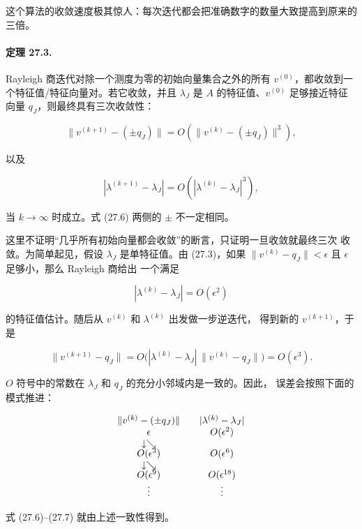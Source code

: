 \documentclass[UTF8,fontset=none,12pt]{ctexart}
\begin{document}
这个算法的收敛速度极其惊人：每次迭代都会把准确数字的数量大致提高到原来的
三倍。

\paragraph{定理 27.3.}
Rayleigh 商迭代对除一个测度为零的初始向量集合之外的所有
$v^{(0)}$，都收敛到一个特征值/特征向量对。若它收敛，并且 $\lambda_J$ 是
$A$ 的特征值、$v^{(0)}$ 足够接近特征向量 $q_J$，则最终具有三次收敛性：

\begin{equation}
\|v^{(k+1)}-(\pm q_J)\|
 =O\left(\|v^{(k)}-(\pm q_J)\|^3\right),
\tag{27.6}
\end{equation}

以及

\begin{equation}
|\lambda^{(k+1)}-\lambda_J|
 =O\left(|\lambda^{(k)}-\lambda_J|^3\right),
\tag{27.7}
\end{equation}

当 $k\to\infty$ 时成立。式 (27.6) 两侧的 $\pm$ 不一定相同。

这里不证明“几乎所有初始向量都会收敛”的断言，只证明一旦收敛就最终三次
收敛。为简单起见，假设 $\lambda_J$ 是单特征值。由 (27.3)，如果
$\|v^{(k)}-q_J\|<\epsilon$ 且 $\epsilon$ 足够小，那么 Rayleigh 商给出
一个满足

\[
|\lambda^{(k)}-\lambda_J|=O(\epsilon^2)
\]

的特征值估计。随后从 $v^{(k)}$ 和 $\lambda^{(k)}$ 出发做一步逆迭代，
得到新的 $v^{(k+1)}$，于是

\[
\|v^{(k+1)}-q_J\|
 =O\bigl(|\lambda^{(k)}-\lambda_J|\,\|v^{(k)}-q_J\|\bigr)
 =O(\epsilon^3).
\]

$O$ 符号中的常数在 $\lambda_J$ 和 $q_J$ 的充分小邻域内是一致的。因此，
误差会按照下面的模式推进：

\[
\begin{array}{c@{\qquad}c}
\|v^{(k)}-(\pm q_J)\| & |\lambda^{(k)}-\lambda_J|\\
\epsilon & O(\epsilon^2)\\
\downarrow\searrow & \\[-2pt]
O(\epsilon^3) & O(\epsilon^6)\\
\downarrow\searrow & \\[-2pt]
O(\epsilon^9) & O(\epsilon^{18})\\
\vdots & \vdots
\end{array}
\]

式 (27.6)–(27.7) 就由上述一致性得到。
\end{document}
